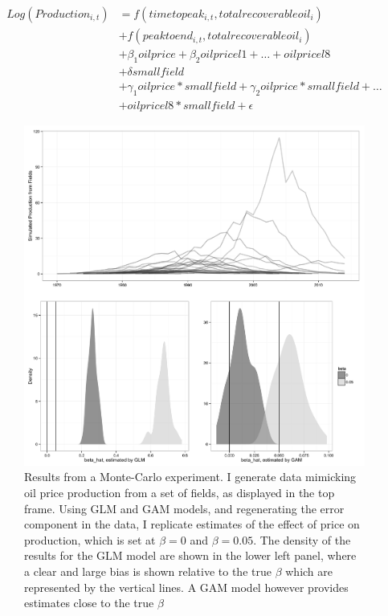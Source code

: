 \documentclass[11pt]{article}
\begin{document}
\begin{equation}
\begin{split}
	Log(Production_{i,t})&=f(timetopeak_{i,t}, totalrecoverableoil_i) \\
	 \quad & + f(peaktoend_{i,t}, totalrecoverableoil_i) \\
	 \quad & + \beta_1 oilprice + \beta_2 oilpricel1 + \dots + oilpricel8\\
	 \quad & + \delta smallfield \\
 	 \quad & + \gamma_1 oilprice*smallfield + \gamma_2 oilprice*smallfield + \dots \\
 	 \quad & + oilpricel8*smallfield +  \epsilon
\label{pooled_eqn}
\end{split}
\end{equation}

\begin{figure}
	\includegraphics[width=1\textwidth]{figures/mc_plot.png}
	\caption{Results from a Monte-Carlo experiment. I generate data mimicking oil price production from a set of fields, as displayed in the top frame. Using GLM and GAM models, and regenerating the error component in the data, I replicate estimates of the effect of price on production, which is set at $\beta = 0$ and $\beta=0.05$. The density of the results for the GLM model are shown in the lower left panel, where a clear and large bias is shown relative to the true $\beta$ which are represented by the vertical lines.  A GAM model however provides estimates close to the true $\beta$}
	\label{mc_results}
\end{figure}
\end{document}
